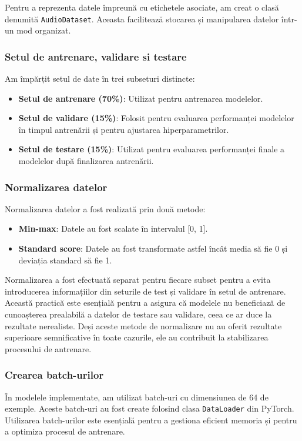 Pentru a reprezenta datele împreună cu etichetele asociate, am creat o clasă denumită \texttt{AudioDataset}. Aceasta facilitează stocarea și manipularea datelor într-un mod organizat.


\subsubsection{Setul de antrenare, validare si testare}

Am împărțit setul de date în trei subseturi distincte:

\begin{itemize}
\item \textbf{Setul de antrenare (70\%)}: Utilizat pentru antrenarea modelelor.
\item \textbf{Setul de validare (15\%)}: Folosit pentru evaluarea performanței modelelor în timpul antrenării și pentru ajustarea hiperparametrilor.
\item \textbf{Setul de testare (15\%)}: Utilizat pentru evaluarea performanței finale a modelelor după finalizarea antrenării.
\end{itemize}


\subsubsection{Normalizarea datelor}

Normalizarea datelor a fost realizată prin două metode:

\begin{itemize}
\item \textbf{Min-max}: Datele au fost scalate în intervalul [0, 1].
\item \textbf{Standard score}: Datele au fost transformate astfel încât media să fie 0 și deviația standard să fie 1.
\end{itemize}

Normalizarea a fost efectuată separat pentru fiecare subset pentru a evita introducerea informațiilor din seturile de test și validare în setul de antrenare. Această practică este esențială pentru a asigura că modelele nu beneficiază de cunoașterea prealabilă a datelor de testare sau validare, ceea ce ar duce la rezultate nerealiste. Deși aceste metode de normalizare nu au oferit rezultate superioare semnificative în toate cazurile, ele au contribuit la stabilizarea procesului de antrenare.


\subsubsection{Crearea batch-urilor}

În modelele implementate, am utilizat batch-uri cu dimensiunea de 64 de exemple. Aceste batch-uri au fost create folosind clasa \texttt{DataLoader} din PyTorch. Utilizarea batch-urilor este esențială pentru a gestiona eficient memoria și pentru a optimiza procesul de antrenare.
